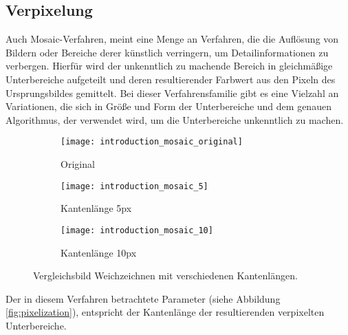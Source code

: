 \subsection{Verpixelung}
Auch Mosaic-Verfahren, meint eine Menge an Verfahren, die die Auflösung von Bildern oder Bereiche derer künstlich
verringern, um Detailinformationen zu verbergen. Hierfür wird der unkenntlich zu machende Bereich in gleichmäßige
Unterbereiche aufgeteilt und deren resultierender Farbwert aus den Pixeln des Ursprungsbildes gemittelt. Bei dieser
Verfahrensfamilie gibt es eine Vielzahl an Variationen, die sich in Größe und Form der Unterbereiche und dem genauen
Algorithmus, der verwendet wird, um die Unterbereiche unkenntlich zu machen.

\begin{figure}[h]
    \centering
    \begin{subfigure}{0.3\textwidth}
        \texttt{[image: introduction\_mosaic\_original]}
        \caption{\small Original}
    \end{subfigure}
    \begin{subfigure}{0.3\textwidth}
        \texttt{[image: introduction\_mosaic\_5]}
        \caption{\small Kantenlänge 5px}
    \end{subfigure}
    \begin{subfigure}{0.3\textwidth}
        \texttt{[image: introduction\_mosaic\_10]}
        \caption{\small Kantenlänge 10px}
    \end{subfigure}

    \caption{Vergleichsbild Weichzeichnen mit verschiedenen Kantenlängen.}
    \label{fig:pixelization}
\end{figure}

Der in diesem Verfahren betrachtete Parameter (siehe Abbildung \space \vref*{fig:pixelization}), entspricht der Kantenlänge der
resultierenden verpixelten Unterbereiche.
